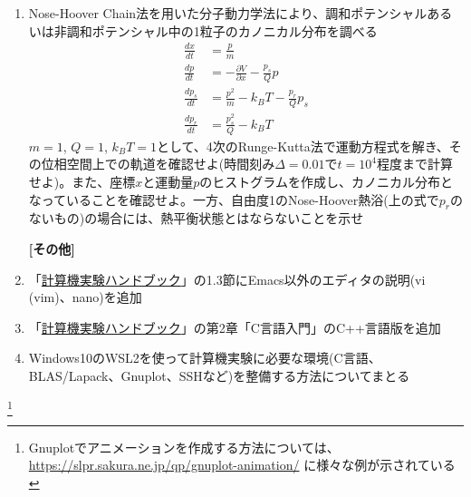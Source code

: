 \documentclass[11pt]{jarticle}
\begin{document}
\begin{enumerate}
\item Nose-Hoover Chain法を用いた分子動力学法により、調和ポテンシャルあるいは非調和ポテンシャル中の1粒子のカノニカル分布を調べる
  \begin{align*}
    \frac{dx}{dt} &= \frac{p}{m} \\
    \frac{dp}{dt} &= -\frac{\partial V}{\partial x} - \frac{p_s}{Q} p \\
    \frac{dp_s}{dt} &= \frac{p^2}{m} - k_B T - \frac{p_r}{Q} p_s \\
    \frac{dp_r}{dt} &= \frac{p_s^2}{Q} - k_B T
  \end{align*}
  $m=1$, $Q=1$, $k_BT=1$として、4次のRunge-Kutta法で運動方程式を解き、その位相空間上での軌道を確認せよ(時間刻み$\Delta=0.01$で$t=10^4$程度まで計算せよ)。また、座標$x$と運動量$p$のヒストグラムを作成し、カノニカル分布となっていることを確認せよ。一方、自由度1のNose-Hoover熱浴(上の式で$p_r$のないもの)の場合には、熱平衡状態とはならないことを示せ
  
\hspace*{-2em} {\bf [その他]}

\item 「\href{https://github.com/utphys-comp/handbook/releases/download/handbook-2019/handbook.pdf}{計算機実験ハンドブック}」の1.3節にEmacs以外のエディタの説明(vi (vim)、nano)を追加

\item 「\href{https://github.com/utphys-comp/handbook/releases/download/handbook-2019/handbook.pdf}{計算機実験ハンドブック}」の第2章「C言語入門」のC++言語版を追加

\item Windows10のWSL2を使って計算機実験に必要な環境(C言語、BLAS/Lapack、Gnuplot、SSHなど)を整備する方法についてまとる

\end{enumerate}  

\renewcommand{\thefootnote}{\fnsymbol{footnote}}
\footnote[0]{Gnuplotでアニメーションを作成する方法については、 \url{https://slpr.sakura.ne.jp/qp/gnuplot-animation/} に様々な例が示されている}
  
\end{document}

